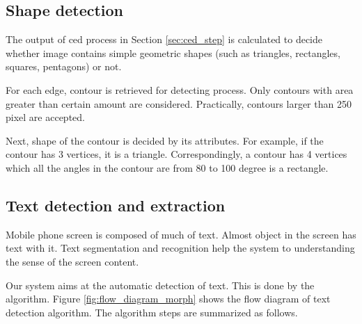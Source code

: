 \subsection{Shape detection}
\label{sec:shape_detect}
The output of \acrshort{ced} process in Section \ref{sec:ced_step} is calculated to decide whether image contains simple geometric shapes (such as triangles, rectangles, squares, pentagons) or not.

For each edge, contour is retrieved for detecting process. Only contours with area greater than certain amount are considered. Practically, contours larger than 250 pixel are accepted.

Next, shape of the contour is decided by its attributes. For example, if the contour has 3 vertices, it is a triangle. Correspondingly, a contour has 4 vertices which all the angles in the contour are from 80 to 100 degree is a rectangle.

\subsection{Text detection and extraction}
\label{sec:text_detect}
Mobile phone screen is composed of much of text. Almost object in the screen has text with it. Text segmentation and recognition help the system to understanding the sense of the screen content.

Our system aims at the automatic detection of text. This is done by the algorithm. Figure \ref{fig:flow_diagram_morph} shows the flow diagram of text detection algorithm. The algorithm steps are summarized as follows.

